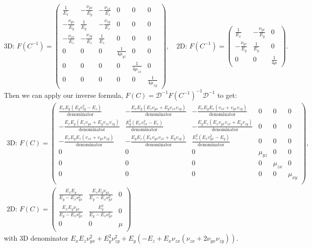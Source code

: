 \documentclass[10pt]{article}
\begin{document}
$$
\text{3D: } F(C^{-1}) =
\begin{pmatrix}
    \frac{1}{E_x} & -\frac{\nu_{yx}}{E_y} & -\frac{\nu_{zx}}{E_z} & 0 & 0 & 0 \\
    -\frac{\nu_{yx}}{E_y} & \frac{1}{E_y} & -\frac{\nu_{zy}}{E_z} & 0 & 0 & 0 \\
    -\frac{\nu_{zx}}{E_z} & -\frac{\nu_{zy}}{E_z} & \frac{1}{E_z} & 0 & 0 & 0 \\
    0 & 0 & 0 & \frac{1}{4 \mu_{yz}} & 0 & 0 \\
    0 & 0 & 0 & 0 & \frac{1}{4 \mu_{zx}} & 0 \\
    0 & 0 & 0 & 0 & 0 & \frac{1}{4 \mu_{xy}}
\end{pmatrix}, \quad
\text{2D: } F(C^{-1}) = 
\begin{pmatrix}
    \frac{1}{E_x} & -\frac{\nu_{yx}}{E_y} & 0 \\
    -\frac{\nu_{yx}}{E_y} & \frac{1}{E_y}  & 0 \\
    0 & 0 & \frac{1}{4 \mu}
\end{pmatrix}.
$$
Then we can apply our inverse formula, 
$
F(C) = \mathscr{D}^{-1} F\left(C^{-1}\right)^{-1} \mathscr{D}^{-1}$ to get:
\begin{gather*}
\text{3D: } F(C) =
\begin{pmatrix}
 \frac{E_{x} E_{y} \left(E_{y} v_{zy}^2-E_{z}\right)}{\text{denominator}} & -\frac{E_{x} E_{y} (E_{z} v_{yx}+E_{y} v_{zx} v_{zy})}{\text{denominator}} & -\frac{E_{x} E_{y} E_{z} (v_{zx}+v_{yx} v_{zy})}{\text{denominator}} & 0 & 0 & 0 \\
 -\frac{E_{x} E_{y} (E_{z} v_{yx}+E_{y} v_{zx} v_{zy})}{\text{denominator}} & \frac{E_{y}^2 \left(E_{x} v_{zx}^2-E_{z}\right)}{\text{denominator}} & -\frac{E_{y} E_{z} (E_{x} v_{yx} v_{zx}+E_{y} v_{zy})}{\text{denominator}} & 0 & 0 & 0 \\
 -\frac{E_{x} E_{y} E_{z} (v_{zx}+v_{yx} v_{zy})}{\text{denominator}} & -\frac{E_{y} E_{z} (E_{x} v_{yx} v_{zx}+E_{y} v_{zy})}{\text{denominator}} & \frac{E_{z}^2 \left(E_{x} v_{yx}^2-E_{y}\right)}{\text{denominator}} & 0 & 0 & 0 \\
 0 & 0 & 0 & \mu_{yz} & 0 & 0 \\
 0 & 0 & 0 & 0 & \mu_{zx} & 0 \\
 0 & 0 & 0 & 0 & 0 & \mu_{xy} \\
\end{pmatrix}, \\
\text{2D: } F(C) =
\begin{pmatrix}
    \frac{E_{x} E_{y}}{E_{y}-E_{x} \nu_{yx}^2} &
    \frac{E_{x} E_{y} \nu_{yx}}{E_{y}-E_{x} \nu_{yx}^2}
    & 0 \\
     \frac{E_{x} E_{y} \nu_{yx}}{E_{y}-E_{x} \nu_{yx}^2}
     & \frac{E_{y}^2}{E_{y}-E_{x} \nu_{yx}^2} & 0 \\
      0 & 0 & \mu \\
 \end{pmatrix}
\end{gather*}
with 3D denominator $E_x E_z \nu_{yx}^2 + E_y^2 \nu_{zy}^2 + E_y (-E_z + E_x
\nu_{zx} (\nu_{zx} + 2 \nu_{yx} \nu_{zy}))$.
\end{document}
